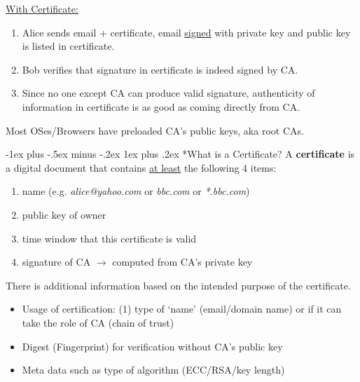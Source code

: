 \documentclass[10pt,landscape]{article}
\makeatletter
\renewcommand{\subsubsection}{\@startsection{subsubsection}{3}{0mm}%
                                {-1ex plus -.5ex minus -.2ex}%
                                {1ex plus .2ex}%
                                {\normalfont\small\bfseries}}
\makeatother
\begin{document}
\begin{multicols*}{3}
\underline{With Certificate:}
\begin{enumerate}[noitemsep,wide=0pt, leftmargin=\dimexpr\labelwidth + 2\labelsep\relax]
    \item Alice sends email + certificate, email \underline{signed} with private key and public key is listed in certificate.
    \item Bob verifies that signature in certificate is indeed signed by CA. 
    \item Since no one except CA can produce valid signature, authenticity of information in certificate is as good as coming directly from CA.
\end{enumerate}

Most OSes/Browsers have preloaded CA's public keys, aka root CAs.

\subsubsection*{What is a Certificate?}
A \textbf{certificate} is a digital document that contains \underline{at least} the following 4 items:
\begin{enumerate}[noitemsep,wide=0pt, leftmargin=\dimexpr\labelwidth + 2\labelsep\relax]
    \item name (e.g. \textit{alice@yahoo.com} or \textit{bbc.com} or \textit{*.bbc.com})
    \item public key of owner
    \item time window that this certificate is valid
    \item signature of CA $\rightarrow$ computed from CA's private key
\end{enumerate}
There is additional information based on the intended purpose of the certificate.
\begin{itemize}[noitemsep,wide=0pt, leftmargin=\dimexpr{} + 2\relax]
    \item Usage of certification: (1) type of `name' (email/domain name) or if it can take the role of CA (chain of trust)
    \item Digest (Fingerprint) for verification without CA's public key
    \item Meta data such as type of algorithm (ECC/RSA/key length)
\end{itemize}



\end{multicols*}
\end{document}
